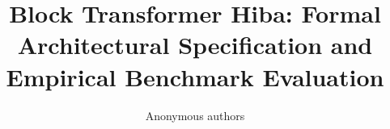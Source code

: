 \title{\textbf{Block Transformer Hiba: Formal Architectural Specification and Empirical Benchmark Evaluation}}

\author{Anonymous authors}
